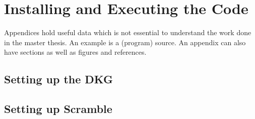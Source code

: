 \chapter{Installing and Executing the Code}
\label{app:A}
Appendices hold useful data which is not essential to understand the work
done in the master thesis. An example is a (program) source.
An appendix can also have sections as well as figures and references\cite{h2g2}.

\section{Setting up the DKG}
\lipsum[50]

\section{Setting up Scramble}
\lipsum[15-17]

